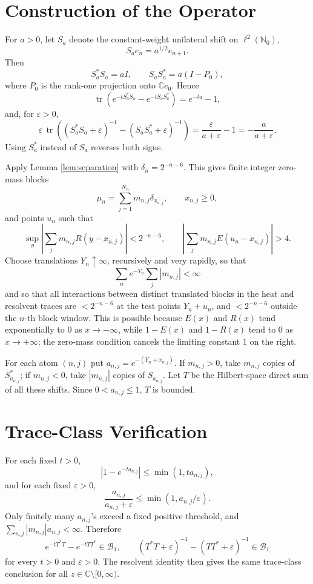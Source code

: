 \documentclass[11pt]{article}
\newcommand{\tr}{\operatorname{tr}}
\newcommand{\eps}{\varepsilon}
\begin{document}
\section*{Construction of the Operator}

For \(a>0\), let \(S_a\) denote the constant-weight unilateral shift on
\(\ell^2(\mathbb N_0)\),
\[
  S_ae_n=a^{1/2}e_{n+1}.
\]
Then
\[
  S_a^*S_a=aI,\qquad S_aS_a^*=a(I-P_0),
\]
where \(P_0\) is the rank-one projection onto \(\mathbb Ce_0\).  Hence
\[
  \tr(e^{-tS_a^*S_a}-e^{-tS_aS_a^*})=e^{-ta}-1,
\]
and, for \(\eps>0\),
\[
  \eps\,\tr((S_a^*S_a+\eps)^{-1}-(S_aS_a^*+\eps)^{-1})
    =\frac{\eps}{a+\eps}-1=-\frac{a}{a+\eps}.
\]
Using \(S_a^*\) instead of \(S_a\) reverses both signs.

Apply Lemma \ref{lem:separation} with \(\delta_n=2^{-n-6}\).  This gives finite
integer zero-mass blocks
\[
  \mu_n=\sum_{j=1}^{N_n}m_{n,j}\delta_{x_{n,j}},\qquad x_{n,j}\geq0,
\]
and points \(u_n\) such that
\[
  \sup_y\left|\sum_jm_{n,j}R(y-x_{n,j})\right|<2^{-n-6},
  \qquad
  \left|\sum_jm_{n,j}E(u_n-x_{n,j})\right|>4.
\]
Choose translations \(Y_n\uparrow\infty\), recursively and very rapidly, so that
\[
  \sum_n e^{-Y_n}\sum_j|m_{n,j}|<\infty
\]
and so that all interactions between distinct translated blocks in the heat and
resolvent traces are \(<2^{-n-6}\) at the test points \(Y_n+u_n\), and \(<2^{-n-6}\)
outside the \(n\)-th block window.  This is possible because \(E(x)\) and \(R(x)\)
tend exponentially to \(0\) as \(x\to-\infty\), while \(1-E(x)\) and \(1-R(x)\)
tend to \(0\) as \(x\to+\infty\); the zero-mass condition cancels the limiting
constant \(1\) on the right.

For each atom \((n,j)\) put \(a_{n,j}=e^{-(Y_n+x_{n,j})}\).  If \(m_{n,j}>0\),
take \(m_{n,j}\) copies of \(S_{a_{n,j}}^*\); if \(m_{n,j}<0\), take
\(|m_{n,j}|\) copies of \(S_{a_{n,j}}\).  Let \(T\) be the Hilbert-space direct
sum of all these shifts.  Since \(0<a_{n,j}\leq 1\), \(T\) is bounded.

\section*{Trace-Class Verification}

For each fixed \(t>0\),
\[
  |1-e^{-ta_{n,j}}|\leq \min(1,ta_{n,j}),
\]
and for each fixed \(\eps>0\),
\[
  \frac{a_{n,j}}{a_{n,j}+\eps}\leq \min(1,a_{n,j}/\eps).
\]
Only finitely many \(a_{n,j}\)'s exceed a fixed positive threshold, and
\(\sum_{n,j}|m_{n,j}|a_{n,j}<\infty\).  Therefore
\[
  e^{-tT^*T}-e^{-tTT^*}\in\mathcal B_1,\qquad
  (T^*T+\eps)^{-1}-(TT^*+\eps)^{-1}\in\mathcal B_1
\]
for every \(t>0\) and \(\eps>0\).  The resolvent identity then gives the same
trace-class conclusion for all \(z\in\mathbb C\setminus[0,\infty)\).
\end{document}
